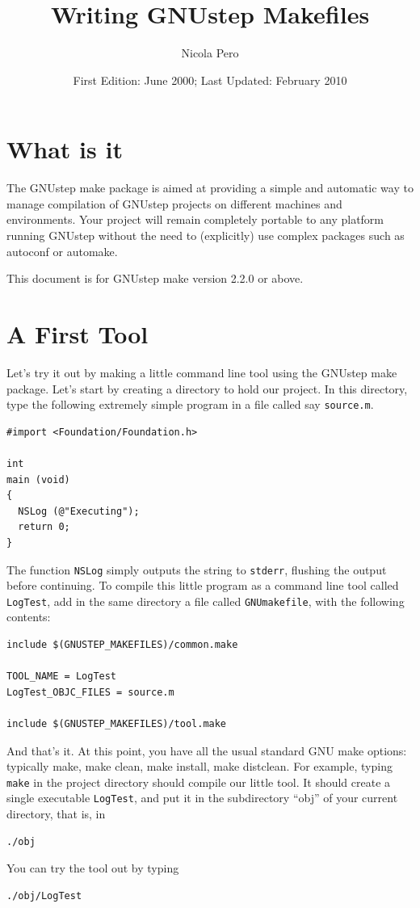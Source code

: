 \documentclass[a4paper]{article}
\begin{document}
\author{Nicola Pero}
\title{Writing GNUstep Makefiles}
\date{First Edition: June 2000; Last Updated: February 2010}
\maketitle

\section{What is it}
The GNUstep make package is aimed at providing a simple and automatic
way to manage compilation of GNUstep projects on different machines
and environments.  Your project will remain completely portable to any
platform running GNUstep without the need to (explicitly) use complex
packages such as autoconf or automake.

This document is for GNUstep make version 2.2.0 or above.

\section{A First Tool}
Let's try it out by making a little command line tool using the
GNUstep make package.  Let's start by creating a directory to hold our
project.  In this directory, type the following extremely simple
program in a file called say \texttt{source.m}.
\begin{verbatim}
#import <Foundation/Foundation.h>

int
main (void)
{ 
  NSLog (@"Executing");
  return 0;
}
\end{verbatim}
The function \texttt{NSLog} simply outputs the string to
\texttt{stderr}, flushing the output before continuing.  To compile
this little program as a command line tool called \texttt{LogTest},
add in the same directory a file called \texttt{GNUmakefile}, with the
following contents:
\begin{verbatim}
include $(GNUSTEP_MAKEFILES)/common.make

TOOL_NAME = LogTest
LogTest_OBJC_FILES = source.m

include $(GNUSTEP_MAKEFILES)/tool.make
\end{verbatim}
And that's it.
At this point, you have all the usual standard GNU make options:
typically make, make clean, make install, make distclean.  For
example, typing \texttt{make} in the project directory should compile
our little tool.
It should create a single executable \texttt{LogTest}, and put it in
the subdirectory ``obj'' of your current directory, that is, in
\begin{verbatim}
./obj
\end{verbatim}
You can try the tool out by typing
\begin{verbatim}
./obj/LogTest
\end{verbatim}
\end{document}

